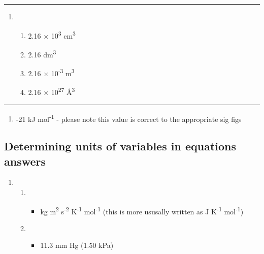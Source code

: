\documentclass[
]{book}
\providecommand{\tightlist}{%
  \setlength{\itemsep}{0pt}\setlength{\parskip}{0pt}}
\begin{document}
\begin{center}\rule{0.5\linewidth}{0.5pt}\end{center}

\begin{enumerate}
\def\labelenumi{\arabic{enumi}.}
\setcounter{enumi}{1}
\item
  \begin{enumerate}
  \def\labelenumii{\alph{enumii}.}
  \tightlist
  \item
    2.16 × 10\textsuperscript{3} cm\textsuperscript{3}
  \item
    2.16 dm\textsuperscript{3}
  \item
    2.16 × 10\textsuperscript{-3} m\textsuperscript{3}
  \item
    2.16 × 10\textsuperscript{27} Å\textsuperscript{3}
  \end{enumerate}
\end{enumerate}

\begin{center}\rule{0.5\linewidth}{0.5pt}\end{center}

\begin{enumerate}
\def\labelenumi{\arabic{enumi}.}
\setcounter{enumi}{2}
\tightlist
\item
  -21 kJ mol\textsuperscript{-1} - please note this value is correct to the appropriate sig figs
\end{enumerate}

\hypertarget{subsec:detunitsans}{%
\subsection{Determining units of variables in equations answers}\label{subsec:detunitsans}}

\begin{enumerate}
\def\labelenumi{\arabic{enumi}.}
\item
  \begin{enumerate}
  \def\labelenumii{\alph{enumii}.}
  \item
    \begin{itemize}
    \tightlist
    \item
      kg m\textsuperscript{2} s\textsuperscript{-2} K\textsuperscript{-1} mol\textsuperscript{-1} (this is more ususally written as J K\textsuperscript{-1} mol\textsuperscript{-1})
    \end{itemize}
  \item
    \begin{itemize}
    \tightlist
    \item
      11.3 mm Hg (1.50 kPa)
    \end{itemize}
  \end{enumerate}
\end{enumerate}
\end{document}
